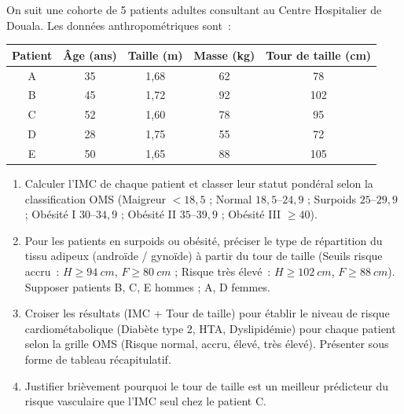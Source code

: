 \documentclass[11pt]{article}
\begin{document}
\begin{exercice}
On suit une cohorte de 5 patients adultes consultant au Centre Hospitalier de Douala. Les données anthropométriques sont~:
\begin{center}
\begin{tabular}{|c|c|c|c|c|}
\hline
\textbf{Patient} & \textbf{Âge (ans)} & \textbf{Taille (m)} & \textbf{Masse (kg)} & \textbf{Tour de taille (cm)} \\
\hline
A & 35 & 1,68 & 62 & 78 \\
B & 45 & 1,72 & 92 & 102 \\
C & 52 & 1,60 & 78 & 95 \\
D & 28 & 1,75 & 55 & 72 \\
E & 50 & 1,65 & 88 & 105 \\
\hline
\end{tabular}
\end{center}
\begin{enumerate}
    \item Calculer l'IMC de chaque patient et classer leur statut pondéral selon la classification OMS (Maigreur $<18,5$ ; Normal $18,5$--$24,9$ ; Surpoids $25$--$29,9$ ; Obésité I $30$--$34,9$ ; Obésité II $35$--$39,9$ ; Obésité III $\ge 40$).
    \item Pour les patients en surpoids ou obésité, préciser le type de répartition du tissu adipeux (androïde / gynoïde) à partir du tour de taille (Seuils risque accru~: $H \ge \SI{94}{cm}$, $F \ge \SI{80}{cm}$ ; Risque très élevé~: $H \ge \SI{102}{cm}$, $F \ge \SI{88}{cm}$). Supposer patients B, C, E hommes ; A, D femmes.
    \item Croiser les résultats (IMC + Tour de taille) pour établir le niveau de risque cardiométabolique (Diabète type 2, HTA, Dyslipidémie) pour chaque patient selon la grille OMS (Risque normal, accru, élevé, très élevé). Présenter sous forme de tableau récapitulatif.
    \item Justifier brièvement pourquoi le tour de taille est un meilleur prédicteur du risque vasculaire que l'IMC seul chez le patient C.
\end{enumerate}
\end{exercice}
\end{document}
